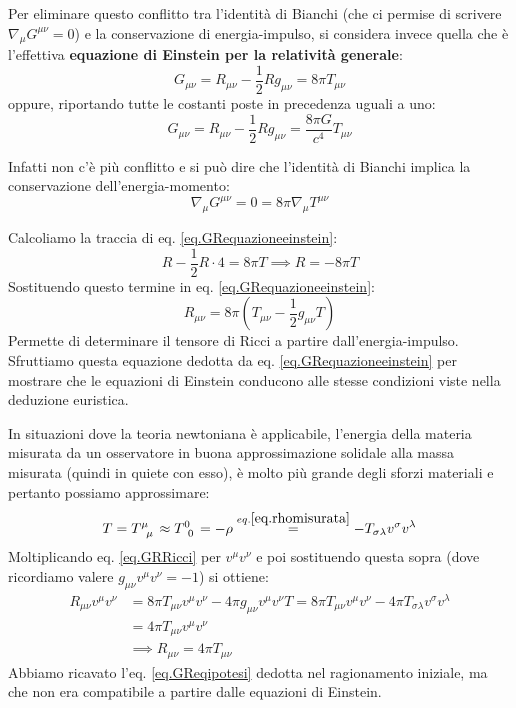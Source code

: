 Per eliminare questo conflitto tra l'identità di Bianchi (che ci permise di scrivere $\nabla_\mu G^{\mu\nu} =0$) e la conservazione di energia-impulso, si considera invece quella che è l'effettiva \textbf{equazione di Einstein per la relatività generale}:
\begin{equation}
    G_{\mu\nu} = R_{\mu\nu} - \frac{1}{2}R g_{\mu\nu} = 8 \pi T_{\mu\nu}
    \label{eq.GRequazioneeinstein}
\end{equation}
oppure, riportando tutte le costanti poste in precedenza uguali a uno:
\begin{equation}
     G_{\mu\nu} = R_{\mu\nu} - \frac{1}{2}R g_{\mu\nu} = \frac{8 \pi G}{c^4} T_{\mu\nu}
\end{equation}

Infatti non c'è più conflitto e si può dire che l'identità di Bianchi implica la conservazione dell'energia-momento:
\begin{equation*}
    \nabla_\mu G^{\mu\nu} = 0 = 8\pi \nabla_\mu T^{\mu\nu}
\end{equation*}

Calcoliamo la traccia di eq. \ref{eq.GRequazioneeinstein}:
\begin{equation*}
    R-\frac{1}{2}R \cdot 4 = 8 \pi T \implies R= -8 \pi T
\end{equation*}
Sostituendo questo termine in eq. \ref{eq.GRequazioneeinstein}:
\begin{equation}
    R_{\mu\nu}= 8\pi \left( T_{\mu\nu} - \frac{1}{2}g_{\mu\nu} T \right)
    \label{eq.GRRicci}
\end{equation}
Permette di determinare il tensore di Ricci a partire dall'energia-impulso. Sfruttiamo questa equazione dedotta da eq. \ref{eq.GRequazioneeinstein} per mostrare che le equazioni di Einstein conducono alle stesse condizioni viste nella deduzione euristica.

In situazioni dove la teoria newtoniana è applicabile, l'energia della materia misurata da un osservatore in buona approssimazione solidale alla massa misurata (quindi in quiete con esso), è molto più grande degli sforzi materiali e pertanto possiamo approssimare:
\begin{equation*}
    T = \tensor{T}{^\mu_\mu} \approx \tensor{T}{^0_0} = - \rho \overset{eq. \ref{eq.rhomisurata}}{=} - T_{\sigma\lambda}v^\sigma v^\lambda
\end{equation*}
Moltiplicando eq. \ref{eq.GRRicci} per $v^\mu v^\nu$ e poi sostituendo questa sopra (dove ricordiamo valere $g_{\mu\nu}v^\mu v^\nu = -1$) si ottiene:
\begin{align*}
    R_{\mu\nu}v^\mu v^\nu &= 8\pi T_{\mu\nu} v^\mu v^\nu -4\pi g_{\mu\nu} v^\mu v^\nu T = 8\pi T_{\mu\nu} v^\mu v^\nu - 4\pi  T_{\sigma\lambda} v^\sigma v^\lambda \\
    &= 4 \pi T_{\mu\nu}v^\mu v^\nu \\
    &\implies R_{\mu\nu} = 4 \pi T_{\mu\nu}
\end{align*}
Abbiamo ricavato l'eq. \ref{eq.GReqipotesi} dedotta nel ragionamento iniziale, ma che non era compatibile a partire dalle equazioni di Einstein.

